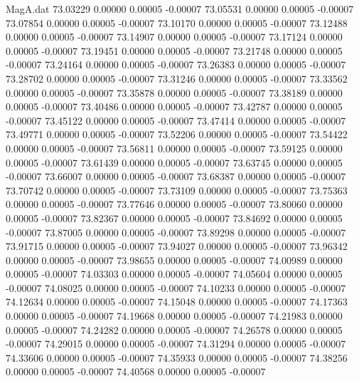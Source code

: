 \begin{filecontents}{MagA.dat}
  73.03229    0.00000    0.00005   -0.00007
  73.05531    0.00000    0.00005   -0.00007
  73.07854    0.00000    0.00005   -0.00007
  73.10170    0.00000    0.00005   -0.00007
  73.12488    0.00000    0.00005   -0.00007
  73.14907    0.00000    0.00005   -0.00007
  73.17124    0.00000    0.00005   -0.00007
  73.19451    0.00000    0.00005   -0.00007
  73.21748    0.00000    0.00005   -0.00007
  73.24164    0.00000    0.00005   -0.00007
  73.26383    0.00000    0.00005   -0.00007
  73.28702    0.00000    0.00005   -0.00007
  73.31246    0.00000    0.00005   -0.00007
  73.33562    0.00000    0.00005   -0.00007
  73.35878    0.00000    0.00005   -0.00007
  73.38189    0.00000    0.00005   -0.00007
  73.40486    0.00000    0.00005   -0.00007
  73.42787    0.00000    0.00005   -0.00007
  73.45122    0.00000    0.00005   -0.00007
  73.47414    0.00000    0.00005   -0.00007
  73.49771    0.00000    0.00005   -0.00007
  73.52206    0.00000    0.00005   -0.00007
  73.54422    0.00000    0.00005   -0.00007
  73.56811    0.00000    0.00005   -0.00007
  73.59125    0.00000    0.00005   -0.00007
  73.61439    0.00000    0.00005   -0.00007
  73.63745    0.00000    0.00005   -0.00007
  73.66007    0.00000    0.00005   -0.00007
  73.68387    0.00000    0.00005   -0.00007
  73.70742    0.00000    0.00005   -0.00007
  73.73109    0.00000    0.00005   -0.00007
  73.75363    0.00000    0.00005   -0.00007
  73.77646    0.00000    0.00005   -0.00007
  73.80060    0.00000    0.00005   -0.00007
  73.82367    0.00000    0.00005   -0.00007
  73.84692    0.00000    0.00005   -0.00007
  73.87005    0.00000    0.00005   -0.00007
  73.89298    0.00000    0.00005   -0.00007
  73.91715    0.00000    0.00005   -0.00007
  73.94027    0.00000    0.00005   -0.00007
  73.96342    0.00000    0.00005   -0.00007
  73.98655    0.00000    0.00005   -0.00007
  74.00989    0.00000    0.00005   -0.00007
  74.03303    0.00000    0.00005   -0.00007
  74.05604    0.00000    0.00005   -0.00007
  74.08025    0.00000    0.00005   -0.00007
  74.10233    0.00000    0.00005   -0.00007
  74.12634    0.00000    0.00005   -0.00007
  74.15048    0.00000    0.00005   -0.00007
  74.17363    0.00000    0.00005   -0.00007
  74.19668    0.00000    0.00005   -0.00007
  74.21983    0.00000    0.00005   -0.00007
  74.24282    0.00000    0.00005   -0.00007
  74.26578    0.00000    0.00005   -0.00007
  74.29015    0.00000    0.00005   -0.00007
  74.31294    0.00000    0.00005   -0.00007
  74.33606    0.00000    0.00005   -0.00007
  74.35933    0.00000    0.00005   -0.00007
  74.38256    0.00000    0.00005   -0.00007
  74.40568    0.00000    0.00005   -0.00007

\end{filecontents}
